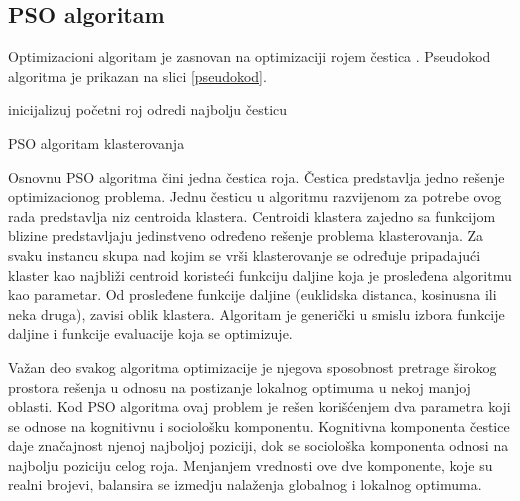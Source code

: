 \documentclass[a4paper,serbian]{symopissr}
\begin{document}
\subsection{PSO algoritam}
\label{sec:algoritam}
Optimizacioni algoritam je zasnovan na optimizaciji rojem čestica \cite{pso}.
Pseudokod algoritma je prikazan na slici \ref{pseudokod}.
\begin{algorithm}
\SetAlgoLined
{}
 inicijalizuj početni roj\;
 odredi najbolju česticu\;
 
 \caption{PSO algoritam klasterovanja}
 \label{pseudokod}
\end{algorithm}

Osnovnu PSO algoritma čini jedna čestica roja. Čestica predstavlja jedno rešenje optimizacionog problema.
Jednu česticu u algoritmu razvijenom za potrebe ovog rada predstavlja niz centroida klastera.
Centroidi klastera zajedno sa funkcijom blizine predstavljaju jedinstveno određeno rešenje problema klasterovanja. Za svaku instancu skupa nad kojim se vrši klasterovanje se određuje pripadajući klaster kao najbliži centroid koristeći funkciju daljine koja je prosleđena algoritmu kao parametar.
Od prosleđene funkcije daljine (euklidska distanca, kosinusna ili neka druga), zavisi oblik klastera.
Algoritam je generički u smislu izbora funkcije daljine i funkcije evaluacije koja se optimizuje.

Važan deo svakog algoritma optimizacije je njegova sposobnost pretrage širokog prostora rešenja u odnosu na postizanje lokalnog optimuma u nekoj manjoj oblasti. Kod PSO algoritma ovaj problem je rešen korišćenjem dva parametra koji se odnose na kognitivnu i sociološku komponentu.
Kognitivna komponenta čestice daje značajnost njenoj najboljoj poziciji, dok se sociološka komponenta odnosi na najbolju poziciju celog roja.
Menjanjem vrednosti ove dve komponente, koje su realni brojevi, balansira se izmedju nalaženja globalnog i lokalnog optimuma.\\
\end{document}
